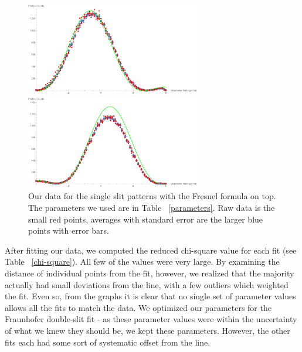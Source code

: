 \documentclass[prb,preprint]{revtex4-1}
\begin{document}
{\begin{figure}[h!]
\centering
\begin{minipage}[b]{0.45\linewidth}
	\includegraphics[width=3in]{far_slit_Fresnel_plot.pdf}
\end{minipage}
\quad
\begin{minipage}[b]{0.45\linewidth}
	\includegraphics[width=3in]{near_slit_Fresnel_plot.pdf}
\end{minipage}
\caption{Our data for the single slit patterns with the Fresnel formula on top. The parameters we used are in Table ~\ref{parameters}. Raw data is the small red points, averages with standard error are the larger blue points with error bars. }
\label{single_slits_Fresnel_plot}
\end{figure} 

After fitting our data, we computed the reduced chi-square value for each fit (see Table ~\ref{chi-square}).  All few of the values were very large.  By examining the distance of individual points from the fit, however, we realized that the majority actually had small deviations from the line, with a few outliers which weighted the fit.  Even so, from the graphs it is clear that no single set of parameter values allows all the fits to match the data.  We optimized our parameters for the Fraunhofer double-slit fit - as these parameter values were within the uncertainty of what we knew they should be, we kept these parameters.  However, the other fits each had some sort of systematic offset from the line.  

}
\end{document}
